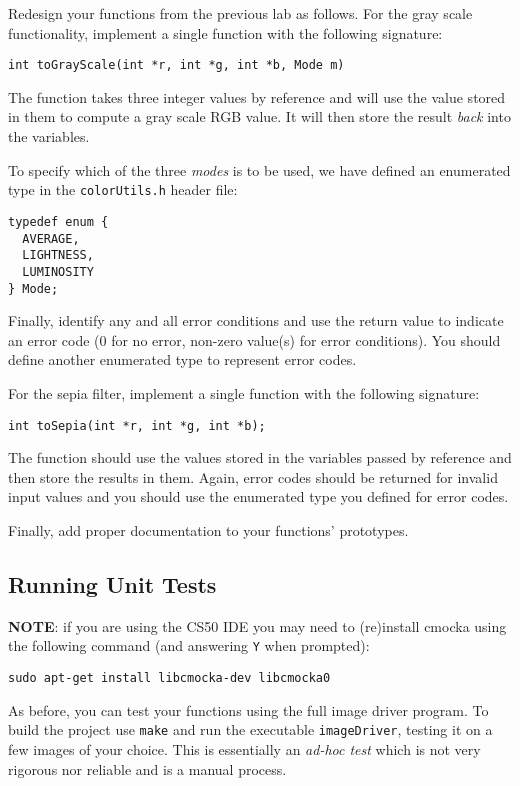 \documentclass[12pt]{scrartcl}
\begin{document}
Redesign your functions from the previous lab as follows.  For 
the gray scale functionality, implement a single function with
the following signature:

\texttt{int toGrayScale(int *r, int *g, int *b, Mode m)}

The function takes three integer values by reference and will 
use the value stored in them to compute a gray scale RGB value.
It will then store the result \emph{back} into the variables.

To specify which of the three \emph{modes} is to be used, we have
defined an enumerated type in the \texttt{colorUtils.h}
header file:
\begin{verbatim}
typedef enum {
  AVERAGE,
  LIGHTNESS,
  LUMINOSITY
} Mode;
\end{verbatim}
Finally, identify any and all error conditions and use the return 
value to indicate an error code (0 for no error, non-zero value(s) 
for error conditions).  You should define another enumerated type
to represent error codes.

For the sepia filter, implement a single function with the following
signature:

\texttt{int toSepia(int *r, int *g, int *b);}

The function should use the values stored in the variables passed
by reference and then store the results in them.  Again, error codes
should be returned for invalid input values and you should use the
enumerated type you defined for error codes.

Finally, add proper documentation to your functions' prototypes.

\subsection{Running Unit Tests}

\textbf{NOTE}: if you are using the CS50 IDE you may need to (re)install
cmocka using the following command (and answering \texttt{Y}
when prompted):

\texttt{sudo apt-get install libcmocka-dev libcmocka0}

As before, you can test your functions using the full image driver
program.  To build the project use \texttt{make} and
run the executable \texttt{imageDriver}, testing it on
a few images of your choice.  This is essentially an 
\emph{ad-hoc test} which is not very rigorous nor reliable 
and is a manual process.  
\end{document}
